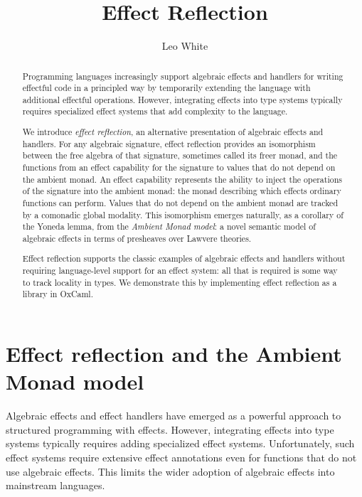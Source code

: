 \documentclass[acmsmall, screen, review, anonymous]{acmart}
\title{Effect Reflection}
\author{Leo White}
\affiliation{\institution{Jane Street}\country{UK}}
\date{}
\theoremstyle{definition}
\begin{document}
\begin{abstract}
  Programming languages increasingly support algebraic effects and
  handlers for writing effectful code in a principled way by temporarily
  extending the language with additional effectful operations. However,
  integrating effects into type systems typically requires specialized
  effect systems that add complexity to the language.

  We introduce \emph{effect reflection}, an alternative presentation of
  algebraic effects and handlers. For any algebraic signature, effect
  reflection provides an isomorphism between the free algebra of that
  signature, sometimes called its freer monad, and the functions from
  an effect capability for the signature to values that do not depend
  on the ambient monad. An effect capability represents the ability to
  inject the operations of the signature into the ambient monad: the
  monad describing which effects ordinary functions can perform. Values
  that do not depend on the ambient monad are tracked by a comonadic
  global modality. This isomorphism emerges naturally, as a corollary
  of the Yoneda lemma, from the \emph{Ambient Monad model}: a novel
  semantic model of algebraic effects in terms of presheaves over
  Lawvere theories.

  Effect reflection supports the classic examples of algebraic effects
  and handlers without requiring language-level support for an effect
  system: all that is required is some way to track locality in
  types. We demonstrate this by implementing effect reflection as a
  library in OxCaml.
\end{abstract}

\maketitle

\section{Effect reflection and the Ambient Monad model}
Algebraic effects and effect handlers have emerged as a powerful
approach to structured programming with effects. However, integrating
effects into type systems typically requires adding specialized effect
systems. Unfortunately, such effect systems require extensive effect
annotations even for functions that do not use algebraic effects. This
limits the wider adoption of algebraic effects into mainstream
languages.
\end{document}
